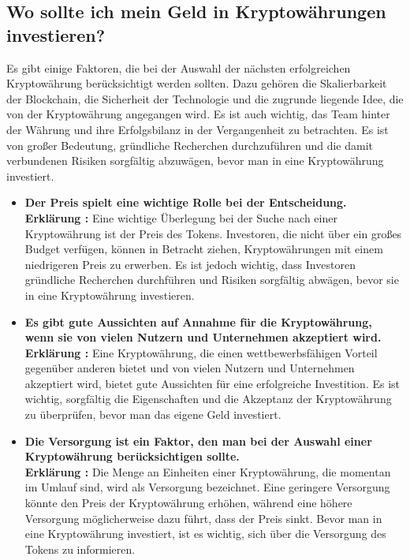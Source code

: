 \documentclass[ngerman]{scrreprt}
\begin{document}
\subsection{Wo sollte ich mein Geld in Kryptowährungen investieren?}
Es gibt einige Faktoren, die bei der Auswahl der nächsten erfolgreichen Kryptowährung berücksichtigt werden sollten. Dazu gehören die Skalierbarkeit der Blockchain, die Sicherheit der Technologie und die zugrunde liegende Idee, die von der Kryptowährung angegangen wird. Es ist auch wichtig, das Team hinter der Währung und ihre Erfolgsbilanz in der Vergangenheit zu betrachten. Es ist von großer Bedeutung, gründliche Recherchen durchzuführen und die damit verbundenen Risiken sorgfältig abzuwägen, bevor man in eine Kryptowährung investiert.
\cite{investopedia2} \cite{smartasset}
\begin{itemize}
	\item \textbf{Der Preis spielt eine wichtige Rolle bei der Entscheidung.}\\
	\textbf{Erklärung :} Eine wichtige Überlegung bei der Suche nach einer Kryptowährung ist der Preis des Tokens. Investoren, die nicht über ein großes Budget verfügen, können in Betracht ziehen, Kryptowährungen mit einem niedrigeren Preis zu erwerben. Es ist jedoch wichtig, dass Investoren gründliche Recherchen durchführen und Risiken sorgfältig abwägen, bevor sie in eine Kryptowährung investieren.
	
	
	\item \textbf{Es gibt gute Aussichten auf Annahme für die Kryptowährung, wenn sie von vielen Nutzern und Unternehmen akzeptiert wird.}\\
	\textbf{Erklärung :} Eine Kryptowährung, die einen wettbewerbsfähigen Vorteil gegenüber anderen bietet und von vielen Nutzern und Unternehmen akzeptiert wird, bietet gute Aussichten für eine erfolgreiche Investition. Es ist wichtig, sorgfältig die Eigenschaften und die Akzeptanz der Kryptowährung zu überprüfen, bevor man das eigene Geld investiert.
	
	
	\item \textbf{Die Versorgung ist ein Faktor, den man bei der Auswahl einer Kryptowährung berücksichtigen sollte.}\\
	\textbf{Erklärung :} Die Menge an Einheiten einer Kryptowährung, die momentan im Umlauf sind, wird als Versorgung bezeichnet. Eine geringere Versorgung könnte den Preis der Kryptowährung erhöhen, während eine höhere Versorgung möglicherweise dazu führt, dass der Preis sinkt. Bevor man in eine Kryptowährung investiert, ist es wichtig, sich über die Versorgung des Tokens zu informieren.
	

\end{itemize}
\end{document}
